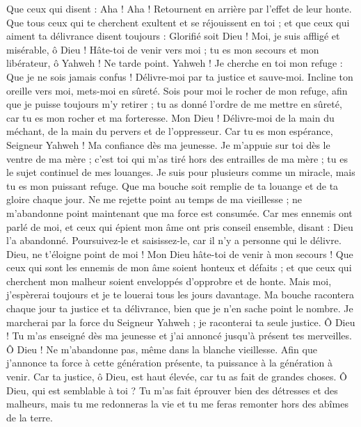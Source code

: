\begin{multicols}{2}
Que ceux qui disent : Aha ! Aha ! Retournent en arrière par l'effet de leur honte.
Que tous ceux qui te cherchent exultent et se réjouissent en toi ; et que ceux qui aiment ta délivrance disent toujours : Glorifié soit Dieu !
Moi, je suis affligé et misérable, ô Dieu ! Hâte-toi de venir vers moi ; tu es mon secours et mon libérateur, ô Yahweh ! Ne tarde point.
\VerseOne{}Yahweh ! Je cherche en toi mon refuge : Que je ne sois jamais confus !
Délivre-moi par ta justice et sauve-moi. Incline ton oreille vers moi, mets-moi en sûreté.
Sois pour moi le rocher de mon refuge, afin que je puisse toujours m'y retirer ; tu as donné l'ordre de me mettre en sûreté, car tu es mon rocher et ma forteresse.
Mon Dieu ! Délivre-moi de la main du méchant, de la main du pervers et de l'oppresseur.
Car tu es mon espérance, Seigneur Yahweh ! Ma confiance dès ma jeunesse.
Je m'appuie sur toi dès le ventre de ma mère ; c'est toi qui m'as tiré hors des entrailles de ma mère ; tu es le sujet continuel de mes louanges.
Je suis pour plusieurs comme un miracle, mais tu es mon puissant refuge.
Que ma bouche soit remplie de ta louange et de ta gloire chaque jour.
Ne me rejette point au temps de ma vieillesse ; ne m'abandonne point maintenant que ma force est consumée.
Car mes ennemis ont parlé de moi, et ceux qui épient mon âme ont pris conseil ensemble,
disant : Dieu l'a abandonné. Poursuivez-le et saisissez-le, car il n'y a personne qui le délivre.
Dieu, ne t'éloigne point de moi ! Mon Dieu hâte-toi de venir à mon secours !
Que ceux qui sont les ennemis de mon âme soient honteux et défaits ; et que ceux qui cherchent mon malheur soient enveloppés d'opprobre et de honte.
Mais moi, j'espèrerai toujours et je te louerai tous les jours davantage.
Ma bouche racontera chaque jour ta justice et ta délivrance, bien que je n'en sache point le nombre.
Je marcherai par la force du Seigneur Yahweh ; je raconterai ta seule justice.
Ô Dieu ! Tu m'as enseigné dès ma jeunesse et j'ai annoncé jusqu'à présent tes merveilles.
Ô Dieu ! Ne m'abandonne pas, même dans la blanche vieillesse. Afin que j'annonce ta force à cette génération présente, ta puissance à la génération à venir.
Car ta justice, ô Dieu, est haut élevée, car tu as fait de grandes choses. Ô Dieu, qui est semblable à toi ?
Tu m'as fait éprouver bien des détresses et des malheurs, mais tu me redonneras la vie et tu me feras remonter hors des abîmes de la terre.

\end{multicols}
